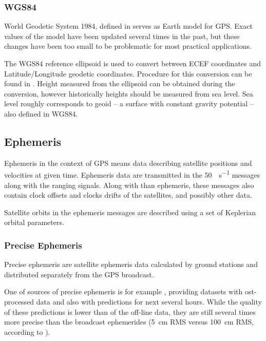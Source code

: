 \subsubsection{WGS84}
World Geodetic System 1984, defined in \cite{nima04}
serves as Earth model for GPS.
Exact values of the model have been updated several times in the past,
but these changes have been too small to be problematic for most practical
applications.

The WGS84 reference ellipsoid is used to convert between ECEF coordinates and
Latitude/Longitude geodetic coordinates.
Procedure for this conversion can be found in \cite{nima04}.
Height measured from the ellipsoid can be obtained during the conversion,
however historically heights should be measured from sea level.
Sea level roughly corresponds to geoid -- a surface with constant gravity
potential -- also defined in WGS84.



\subsection{Ephemeris}
\label{sec:gps-ephemeris}

Ephemeris in the context of GPS means data describing satellite positions and velocities
at given time.
Ephemeris data are transmitted in the \SI{50}{\bit\per\second} messages along with the ranging signals.
Along with than ephemeris, these messages also contain clock offsets and clocks drifts of the satellites,
and possibly other data.

Satellite orbits in the ephemeris messages are described using a set of Keplerian orbital parameters.

\subsubsection{Precise Ephemeris}
Precise ephemeris are satellite ephemeris data calculated by ground stations
and distributed separately from the GPS broadcast.

One of sources of precise ephemeris is for example \cite{orbit-data}, providing datasets with
ost-processed data and also with predictions for next several hours.
While the quality of these predictions is lower than of the off-line data,
they are still several times more precise than the broadcast ephemerides
(\SI{5}{\centi\meter} RMS versus \SI{100}{\centi\meter} RMS, according to \cite{orbit-data}).

